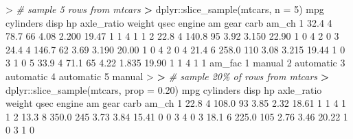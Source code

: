 \documentclass[
]{book}
\newenvironment{Shaded}{\begin{snugshade}}{\end{snugshade}}
\newcommand{\AttributeTok}[1]{\textcolor[rgb]{0.77,0.63,0.00}{#1}}
\newcommand{\CommentTok}[1]{\textcolor[rgb]{0.56,0.35,0.01}{\textit{#1}}}
\newcommand{\DecValTok}[1]{\textcolor[rgb]{0.00,0.00,0.81}{#1}}
\newcommand{\ErrorTok}[1]{\textcolor[rgb]{0.64,0.00,0.00}{\textbf{#1}}}
\newcommand{\FloatTok}[1]{\textcolor[rgb]{0.00,0.00,0.81}{#1}}
\newcommand{\FunctionTok}[1]{\textcolor[rgb]{0.00,0.00,0.00}{#1}}
\newcommand{\NormalTok}[1]{#1}
\newcommand{\SpecialCharTok}[1]{\textcolor[rgb]{0.00,0.00,0.00}{#1}}
\begin{document}
\begin{Shaded}
\begin{Highlighting}[]
\SpecialCharTok{\textgreater{}} \CommentTok{\# sample 5 rows from mtcars}
\ErrorTok{\textgreater{}}\NormalTok{ dplyr}\SpecialCharTok{::}\FunctionTok{slice\_sample}\NormalTok{(mtcars, }\AttributeTok{n =} \DecValTok{5}\NormalTok{)}
\NormalTok{   mpg cylinders  disp  hp axle\_ratio weight  qsec engine am gear carb am\_ch}
\DecValTok{1} \FloatTok{32.4}         \DecValTok{4}  \FloatTok{78.7}  \DecValTok{66}       \FloatTok{4.08}  \FloatTok{2.200} \FloatTok{19.47}      \DecValTok{1}  \DecValTok{1}    \DecValTok{4}    \DecValTok{1}     \DecValTok{1}
\DecValTok{2} \FloatTok{22.8}         \DecValTok{4} \FloatTok{140.8}  \DecValTok{95}       \FloatTok{3.92}  \FloatTok{3.150} \FloatTok{22.90}      \DecValTok{1}  \DecValTok{0}    \DecValTok{4}    \DecValTok{2}     \DecValTok{0}
\DecValTok{3} \FloatTok{24.4}         \DecValTok{4} \FloatTok{146.7}  \DecValTok{62}       \FloatTok{3.69}  \FloatTok{3.190} \FloatTok{20.00}      \DecValTok{1}  \DecValTok{0}    \DecValTok{4}    \DecValTok{2}     \DecValTok{0}
\DecValTok{4} \FloatTok{21.4}         \DecValTok{6} \FloatTok{258.0} \DecValTok{110}       \FloatTok{3.08}  \FloatTok{3.215} \FloatTok{19.44}      \DecValTok{1}  \DecValTok{0}    \DecValTok{3}    \DecValTok{1}     \DecValTok{0}
\DecValTok{5} \FloatTok{33.9}         \DecValTok{4}  \FloatTok{71.1}  \DecValTok{65}       \FloatTok{4.22}  \FloatTok{1.835} \FloatTok{19.90}      \DecValTok{1}  \DecValTok{1}    \DecValTok{4}    \DecValTok{1}     \DecValTok{1}
\NormalTok{     am\_fac}
\DecValTok{1}\NormalTok{    manual}
\DecValTok{2}\NormalTok{ automatic}
\DecValTok{3}\NormalTok{ automatic}
\DecValTok{4}\NormalTok{ automatic}
\DecValTok{5}\NormalTok{    manual}
\SpecialCharTok{\textgreater{}} 
\ErrorTok{\textgreater{}} \CommentTok{\# sample 20\% of rows from mtcars}
\ErrorTok{\textgreater{}}\NormalTok{ dplyr}\SpecialCharTok{::}\FunctionTok{slice\_sample}\NormalTok{(mtcars, }\AttributeTok{prop =} \FloatTok{0.20}\NormalTok{)}
\NormalTok{   mpg cylinders  disp  hp axle\_ratio weight  qsec engine am gear carb am\_ch}
\DecValTok{1} \FloatTok{22.8}         \DecValTok{4} \FloatTok{108.0}  \DecValTok{93}       \FloatTok{3.85}   \FloatTok{2.32} \FloatTok{18.61}      \DecValTok{1}  \DecValTok{1}    \DecValTok{4}    \DecValTok{1}     \DecValTok{1}
\DecValTok{2} \FloatTok{13.3}         \DecValTok{8} \FloatTok{350.0} \DecValTok{245}       \FloatTok{3.73}   \FloatTok{3.84} \FloatTok{15.41}      \DecValTok{0}  \DecValTok{0}    \DecValTok{3}    \DecValTok{4}     \DecValTok{0}
\DecValTok{3} \FloatTok{18.1}         \DecValTok{6} \FloatTok{225.0} \DecValTok{105}       \FloatTok{2.76}   \FloatTok{3.46} \FloatTok{20.22}      \DecValTok{1}  \DecValTok{0}    \DecValTok{3}    \DecValTok{1}     \DecValTok{0}

\end{Highlighting}
\end{Shaded}
\end{document}
